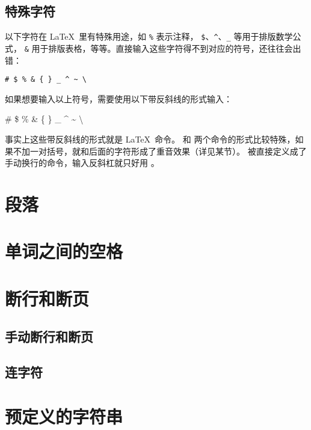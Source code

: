 \subsection{特殊字符}\label{subsec:special-chars}

以下字符在 \LaTeX\ 里有特殊用途，如 \texttt\% 表示注释， \texttt\$、\texttt\textasciicircum 、\texttt\_ 等用于排版数学公式，
\texttt\& 用于排版表格，等等。直接输入这些字符得不到对应的符号，还往往会出错：
\begin{verbatim}
# $ % & { } _ ^ ~ \
\end{verbatim}

如果想要输入以上符号，需要使用以下带反斜线的形式输入：
\begin{example}
\# \$ \% \& \{ \} \_ 
\^{} \~{}
\textbackslash
\end{example}

事实上这些带反斜线的形式就是 \LaTeX\ 命令。\cmd{\textasciicircum} 和 \cmd{\textasciitilde} 
两个命令的形式比较特殊，如果不加一对括号，就和后面的字符形成了重音效果（详见某节）。
 被直接定义成了手动换行的命令，输入反斜杠就只好用 。

\section{段落}

\leavevmode\nobreakspace

\section{单词之间的空格}

\leavevmode\nobreakspace

\section{断行和断页}

\leavevmode\nobreakspace

\subsection{手动断行和断页}

\leavevmode\nobreakspace

\subsection{连字符}

\leavevmode\nobreakspace

\section{预定义的字符串}

\leavevmode\nobreakspace

\endinput